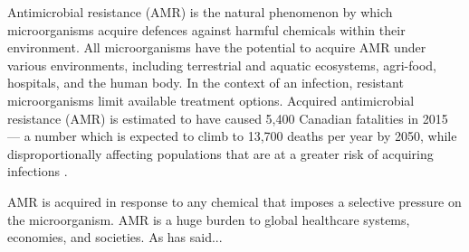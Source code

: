 Antimicrobial resistance (AMR) is the natural phenomenon by which microorganisms acquire defences against harmful chemicals within their environment.
All microorganisms have the potential to acquire AMR under various environments, including terrestrial and aquatic ecosystems, agri-food, hospitals, and the human body.
In the context of an infection, resistant microorganisms limit available treatment options.
Acquired antimicrobial resistance (AMR) is estimated to have caused 5,400 Canadian fatalities in 2015 — a number which is expected to climb to 13,700 deaths per year by 2050, while disproportionally affecting populations that are at a greater risk of acquiring infections \cite{councilofcanadianacademiesWhenAntibioticsFail2019}.

AMR is acquired in response to any chemical that imposes a selective pressure on the microorganism.
AMR is a huge burden to global healthcare systems, economies, and societies.
As \cite{buongerminopereiraComprehensiveSurveyIntegronassociated2020} has said...
